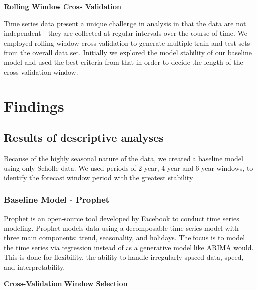 \documentclass[12pt,oneside]{chicagocapstone}
\begin{document}
\textbf{Rolling Window Cross Validation}

Time series data present a unique challenge in analysis in that the data
are not independent - they are collected at regular intervals over the
course of time. We employed rolling window cross validation to generate
multiple train and test sets from the overall data set. Initially we
explored the model stability of our baseline model and used the best
criteria from that in order to decide the length of the cross validation
window.

\chapter*{Findings}\label{findings}

\section*{Results of descriptive analyses}\label{findings-descriptive}

Because of the highly seasonal nature of the data, we created a baseline
model using only Scholle data. We used periods of 2-year, 4-year and
6-year windows, to identify the forecast window period with the greatest
stability.

\subsection*{Baseline Model - Prophet}\label{findings-baseline}

Prophet is an open-source tool developed by Facebook to conduct time
series modeling. Prophet models data using a decomposable time series
model with three main components: trend, seasonality, and holidays. The
focus is to model the time series via regression instead of as a
generative model like ARIMA would. This is done for flexibility, the
ability to handle irregularly spaced data, speed, and interpretability.

\textbf{Cross-Validation Window Selection}
\end{document}
